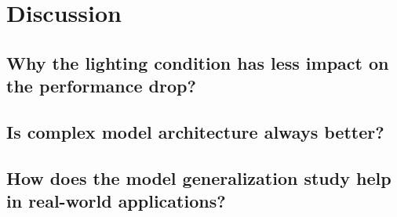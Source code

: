 \section{Discussion}

\subsection{Why the lighting condition has less impact on the performance drop?}

\subsection{Is complex model architecture always better?}

\subsection{How does the model generalization study help in real-world applications?}

